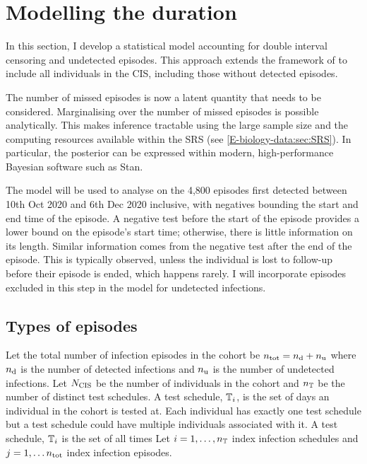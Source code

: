 \documentclass[thesis.tex]{subfiles}
\begin{document}
\section{Modelling the duration}\label{perf-test:sec:model}

In this section, I develop a statistical model accounting for double interval censoring and undetected episodes.
This approach extends the framework of \textcite{heiseyModelling} to include all individuals in the CIS, including those without detected episodes.

The number of missed episodes is now a latent quantity that needs to be considered.
Marginalising over the number of missed episodes is possible analytically.
This makes inference tractable using the large sample size and the computing resources available within the SRS (see \cref{E-biology-data:sec:SRS}).
In particular, the posterior can be expressed within modern, high-performance Bayesian software such as Stan.

The model will be used to analyse on the 4,800 episodes first detected between 10th Oct 2020 and 6th Dec 2020 inclusive, with negatives bounding the start and end time of the episode.
A negative test before the start of the episode provides a lower bound on the episode's start time; otherwise, there is little information on its length.
Similar information comes from the negative test after the end of the episode.
This is typically observed, unless the individual is lost to follow-up before their episode is ended, which happens rarely.
I will incorporate episodes excluded in this step in the model for undetected infections.

\subsection{Types of episodes}

Let the total number of infection episodes in the cohort be $n_\text{tot} = n_\text{d} + n_\text{u}$ where $n_\text{d}$ is the number of detected infections and $n_\text{u}$ is the number of undetected infections.
Let $N_\text{CIS}$ be the number of individuals in the cohort and $n_{\mathbb{T}}$ be the number of distinct test schedules.
A test schedule, $\mathbb{T}_i$, is the set of days an individual in the cohort is tested at.
Each individual has exactly one test schedule but a test schedule could have multiple individuals associated with it.
A test schedule, $\mathbb{T}_i$ is the set of all times 
Let $i = 1, \dots, n_{\mathbb{T}}$ index infection schedules and $j = 1, \dots n_\text{tot}$ index infection episodes.
\end{document}
